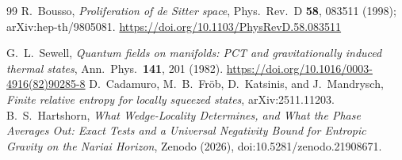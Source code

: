 \documentclass[11pt]{article}
\begin{document}
\begin{thebibliography}{99}
 R.~Bousso, \emph{Proliferation of de Sitter space}, Phys.\ Rev.\ D \textbf{58}, 083511 (1998); arXiv:hep-th/9805081. \url{https://doi.org/10.1103/PhysRevD.58.083511}

 G.~L.~Sewell, \emph{Quantum fields on manifolds: PCT and gravitationally induced thermal states}, Ann.\ Phys.\ \textbf{141}, 201 (1982). \url{https://doi.org/10.1016/0003-4916(82)90285-8}
 D.~Cadamuro, M.~B.~Fr\"ob, D.~Katsinis, and J.~Mandrysch, \emph{Finite relative entropy for locally squeezed states}, arXiv:2511.11203.
 B.~S.~Hartshorn, \emph{What Wedge-Locality Determines, and What the Phase Averages Out: Exact Tests and a Universal Negativity Bound for Entropic Gravity on the Nariai Horizon}, Zenodo (2026), doi:10.5281/zenodo.21908671.
\end{thebibliography}
\endgroup
\end{document}
